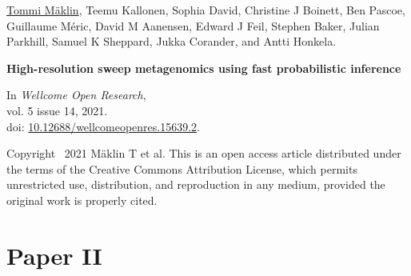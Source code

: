 \vspace{80pt}
\underline{Tommi Mäklin}, Teemu Kallonen, Sophia David, Christine J
Boinett, Ben Pascoe, Guillaume Méric, David M Aanensen, Edward J Feil,
Stephen Baker, Julian Parkhill, Samuel K Sheppard, Jukka Corander, and
Antti Honkela.

\vspace{10pt}
\noindent\textbf{High-resolution sweep metagenomics using fast probabilistic inference}

\vspace{10pt}
\noindent In
\emph{Wellcome Open Research},
\\vol. 5 issue 14, 2021.
\\doi: \href{https://doi.org/10.12688/wellcomeopenres.15639.2}{10.12688/wellcomeopenres.15639.2}.

\vspace{60pt}
\noindent Copyright \textcopyright\ 2021 Mäklin T et al. This is an
open access article distributed under the terms of the Creative
Commons Attribution License, which permits unrestricted use,
distribution, and reproduction in any medium, provided the original
work is properly cited.

\newpage
\thispagestyle{empty}
\mbox{}
\newpage\cleardoublepage





\chapter*{Paper II}\thispagestyle{plain}







